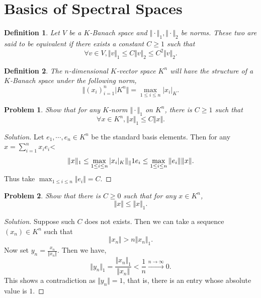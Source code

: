 \documentclass[8pt]{article}
\numberwithin{equation}{section}
\newenvironment{solution}{\begin{proof}[Solution]}{\end{proof}}
\newtheorem{definition}{Definition}[section]
\newtheorem{problem}{Problem}[section]
\newcommand{\norm}[1]{\Vert #1 \Vert}
\newcommand{\ab}[1]{\vert #1 \vert}
\begin{document}
\section{Basics of Spectral Spaces}
\begin{definition}
  Let $V$ be a $K$-Banach space and $\norm{\cdot}_1,\norm{\cdot}_2$ be norms. These two are said to be equivalent if there exists a constant $C\geq 1$ such that 
  \begin{equation*}
    \forall v\in V, \norm{v}_1\leq C\norm{v}_2\leq C^2\norm{v}_2.
  \end{equation*}
\end{definition}
\begin{definition}
  The $n$-dimensional $K$-vector space $K^n$ will have the structure of a $K$-Banach space under the following norm,
  \begin{equation*}
    \norm{(x_i)_{i=1}^n|K^n} = \max_{1\leq i\leq n}\ab{x_i}_K.
  \end{equation*}
\end{definition}
\begin{problem}
  Show that for any $K$-norm $\norm{\cdot}_1$ on $K^n$, there is $C\geq 1$ such that
  \begin{equation*}
    \forall x\in K^n, \norm{x}_1\leq C\norm{x}.
  \end{equation*}
\end{problem}
\begin{solution}
  Let $e_1,\cdots,e_n\in K^n$ be the standard basis elements. Then for any $x=\sum_{i=1}^n x_ie_i$<
  \begin{equation*}
    \norm{x}_1\leq \max_{1\leq i\leq n}\ab{x_i}_K\norm_1{e_i}\leq \max_{1\leq i\leq n}\norm{e_i}\norm{x}.
  \end{equation*}
  Thus take $ \max_{1\leq i\leq n}\norm{e_i}=C$.
\end{solution}
\begin{problem}
  Show that there is $C\geq 0$ such that for any $x\in K^n$,
  \begin{equation*}
    \norm{x}\leq \norm{x}_1.
  \end{equation*}
\end{problem}
\begin{solution}
  Suppose such $C$ does not exists. Then we can take a sequence $(x_n)\in K^n$ such that 
  \begin{equation*}
    \norm{x_n}> n\norm{x_n}_1.
  \end{equation*}
  Now set $y_n = {\frac {x_n} {\norm{x_n}}}$. Then we have,
  \begin{equation*}
    \norm{y_n}_1 = {\frac {\norm{x_n}_1} {\norm{x_n}}} < {\frac 1 n}\stackrel{n\to\infty}{\to}0.
  \end{equation*}
  This shows a contradiction as $\norm{y_n} = 1$, that is, there is an entry whose absolute value is $1$.
\end{solution}
\end{document}
